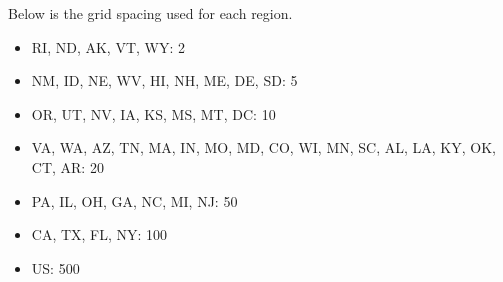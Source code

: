 Below is the grid spacing used for each region.
\begin{itemize}
  \item RI, ND, AK, VT, WY: 2
  \item NM, ID, NE, WV, HI, NH, ME, DE, SD: 5
  \item OR, UT, NV, IA, KS, MS, MT, DC: 10
  \item VA, WA, AZ, TN, MA, IN, MO, MD, CO, WI, MN, SC, AL, LA, KY, OK, CT, AR: 20
  \item PA, IL, OH, GA, NC, MI, NJ: 50
  \item CA, TX, FL, NY: 100
  \item US: 500
\end{itemize}
